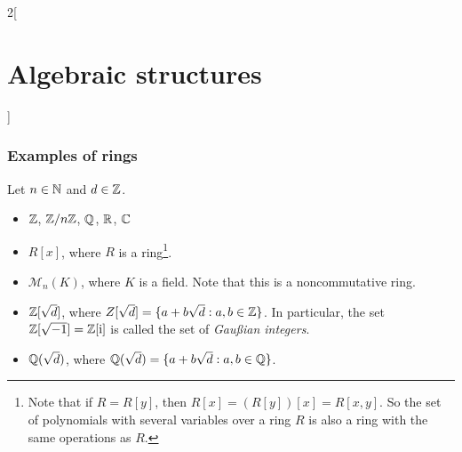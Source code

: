 \documentclass[../../../main.tex]{subfiles}
\begin{document}
\begin{multicols}{2}[\section{Algebraic structures}]
\subsubsection*{Examples of rings}\label{AS-examples2}
Let $n\in\mathbb{N}$ and $d\in\mathbb{Z}$.
\begin{itemize}
    \item $\mathbb{Z}$, $\mathbb{Z}/n\mathbb{Z}$, $\mathbb{Q}$, $\mathbb{R}$, $\mathbb{C}$
    \item $R[x]$, where $R$ is a ring\footnote{Note that if $R=R[y]$, then $R[x]=(R[y])[x]=R[x,y]$. So the set of polynomials with several variables over a ring $R$ is also a ring with the same operations as $R$.}.
    \item $\mathcal{M}_n(K)$, where $K$ is a field. Note that this is a noncommutative ring.
    \item $\mathbb{Z}[\sqrt{d}]$, where $Z[\sqrt{d}]=\{a+b\sqrt{d}:a,b\in\mathbb{Z}\}$. In particular, the set $\mathbb{Z}[\sqrt{-1}]=\mathbb{Z}[\text{i}]$ is called the set of \textit{Gau\ss ian integers}.
    \item $\mathbb{Q}(\sqrt{d})$, where $\mathbb{Q}(\sqrt{d})=\{a+b\sqrt{d}:a,b\in\mathbb{Q}\}$.
\end{itemize}
\end{multicols}
\end{document}
